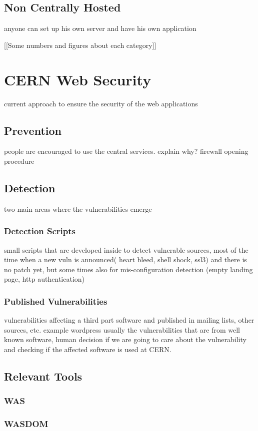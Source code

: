 \subsection{Non Centrally Hosted}
anyone can set up his own server and have his own application

[[Some numbers and figures about each category]]


\section{CERN Web Security}
current approach to ensure the security of the web applications
\subsection{Prevention}
people are encouraged to use the central services. explain why?
firewall opening procedure

\subsection{Detection}
two main areas where the vulnerabilities emerge
\subsubsection{Detection Scripts}
small scripts that are developed inside to detect vulnerable sources, most of the time when a new vuln is announced( heart bleed, shell shock, ssl3) and there is no patch yet, but some times also for mis-configuration detection (empty landing page, http authentication)
\subsubsection{Published Vulnerabilities}
vulnerabilities affecting a third part software and published in mailing lists, other sources, etc. example wordpress
usually the vulnerabilities that are from well known software, human decision if we are going to care about the vulnerability and checking if the affected software is used at CERN.

\subsection{Relevant Tools}
\subsubsection{WAS}
\subsubsection{WASDOM}
